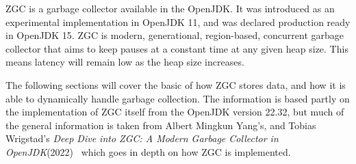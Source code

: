 
ZGC is a garbage collector available in the OpenJDK. It was introduced as an experimental implementation in OpenJDK 11, and was declared production ready in OpenJDK 15. ZGC is modern, generational, region-based, concurrent garbage collector that aims to keep pauses at a constant time at any given heap size. This means latency will remain low as the heap size increases.

The following sections will cover the basic of how ZGC stores data, and how it is able to dynamically handle garbage collection. The information is based partly on the implementation of ZGC itself from the OpenJDK version 22.32, but much of the general information is taken from Albert Mingkun Yang's, and Tobias Wrigstad's \textit{Deep Dive into ZGC: A Modern Garbage Collector in OpenJDK}(2022)~\cite{zgc:deepdive} which goes in depth on how ZGC is implemented.

